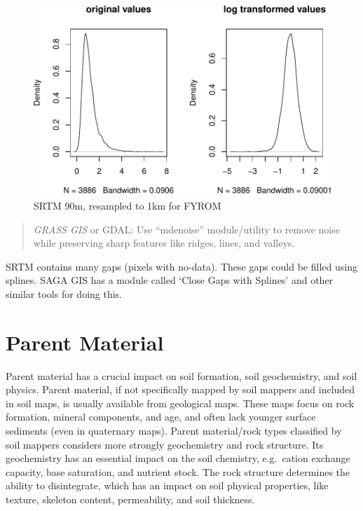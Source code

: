 \documentclass[10pt,b5paper,]{book}
\theoremstyle{definition}
\theoremstyle{definition}
\theoremstyle{definition}
\theoremstyle{remark}
\begin{document}
\begin{figure}
\centering
\includegraphics{SOCMapping_files/figure-latex/unnamed-chunk-15-1.pdf}
\caption{\label{fig:unnamed-chunk-15}SRTM 90m, resampled to 1km for FYROM}
\end{figure}

\begin{quote}
\emph{GRASS GIS} or GDAL: Use ``mdenoise'' module/utility to remove
noise while preserving sharp features like ridges, lines, and valleys.
\end{quote}

SRTM contains many gaps (pixels with no-data). These gaps could be
filled using splines. SAGA GIS has a module called `Close Gaps with
Splines' and other similar tools for doing this.

\hypertarget{parent-material}{%
\section{Parent Material}\label{parent-material}}

Parent material has a crucial impact on soil formation, soil
geochemistry, and soil physics. Parent material, if not specifically
mapped by soil mappers and included in soil maps, is usually available
from geological maps. These maps focus on rock formation, mineral
components, and age, and often lack younger surface sediments (even in
quaternary maps). Parent material/rock types classified by soil mappers
considers more strongly geochemistry and rock structure. Its
geochemistry has an essential impact on the soil chemistry, e.g.~cation
exchange capacity, base saturation, and nutrient stock. The rock
structure determines the ability to disintegrate, which has an impact on
soil physical properties, like texture, skeleton content, permeability,
and soil thickness.
\end{document}
